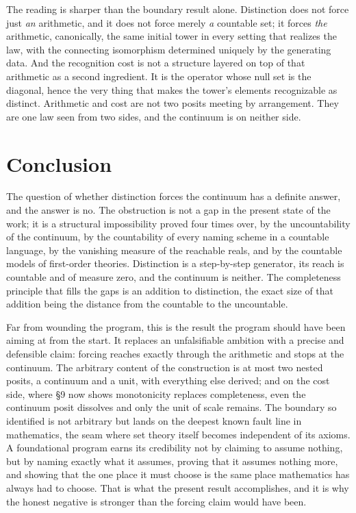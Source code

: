 \documentclass[11pt,a4paper]{article}
\theoremstyle{definition}
\theoremstyle{remark}
\begin{document}
The reading is sharper than the boundary result alone. Distinction does not force
just \emph{an} arithmetic, and it does not force merely \emph{a} countable set; it
forces \emph{the} arithmetic, canonically, the same initial tower in every setting
that realizes the law, with the connecting isomorphism determined uniquely by the
generating data. And the recognition cost is not a structure layered on top of
that arithmetic as a second ingredient. It is the operator whose null set is the
diagonal, hence the very thing that makes the tower's elements recognizable as
distinct. Arithmetic and cost are not two posits meeting by arrangement. They are
one law seen from two sides, and the continuum is on neither side.

\section{Conclusion}

The question of whether distinction forces the continuum has a definite answer,
and the answer is no. The obstruction is not a gap in the present state of the
work; it is a structural impossibility proved four times over, by the
uncountability of the continuum, by the countability of every naming scheme in a
countable language, by the vanishing measure of the reachable reals, and by the
countable models of first-order theories. Distinction is a step-by-step
generator, its reach is countable and of measure zero, and the continuum is
neither. The completeness principle that fills the gaps is an addition to
distinction, the exact size of that addition being the distance from the
countable to the uncountable.

Far from wounding the program, this is the result the program should have been
aiming at from the start. It replaces an unfalsifiable ambition with a precise and
defensible claim: forcing reaches exactly through the arithmetic and stops at the
continuum. The arbitrary content of the construction is at most two nested posits,
a continuum and a unit, with everything else derived; and on the cost side, where
\S9 now shows monotonicity replaces completeness, even the continuum posit
dissolves and only the unit of scale remains. The boundary so
identified is not arbitrary but lands on the deepest known fault line in
mathematics, the seam where set theory itself becomes independent of its axioms.
A foundational program earns its credibility not by claiming to assume nothing,
but by naming exactly what it assumes, proving that it assumes nothing more, and
showing that the one place it must choose is the same place mathematics has always
had to choose. That is what the present result accomplishes, and it is why the
honest negative is stronger than the forcing claim would have been.
\end{document}
